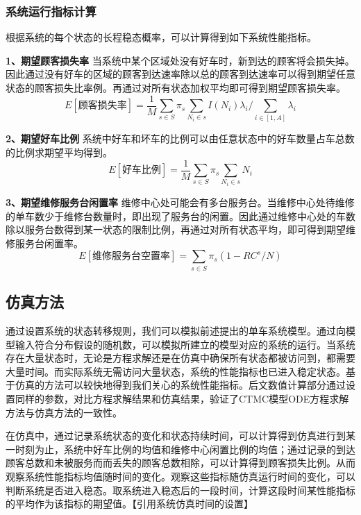 \documentclass{article}
\begin{document}
\subsubsection{系统运行指标计算}
根据系统的每个状态的长程稳态概率，可以计算得到如下系统性能指标。

\textbf{1、期望顾客损失率}
当系统中某个区域处没有好车时，新到达的顾客将会损失掉。因此通过没有好车的区域的顾客到达速率除以总的顾客到达速率可以得到期望任意状态的顾客损失比率例。再通过对所有状态加权平均即可得到期望顾客损失率。
\begin{equation}
E[\mbox{顾客损失率}] = \frac{1}{M} \sum \limits _{s \in S} \pi_{s} \sum \limits _{N_i \in s} I(N_i) \lambda_i / \sum \limits _{i \in [1,A]} \lambda_i 
\end{equation}

\textbf{2、期望好车比例}
系统中好车和坏车的比例可以由任意状态中的好车数量占车总数的比例求期望平均得到。
\begin{equation}
    E[\mbox{好车比例}] = \frac{1}{M} \sum \limits _{s \in S} \pi_{s} \sum \limits _{N_i \in s} N_i 
\end{equation}

\textbf{3、期望维修服务台闲置率}
维修中心处可能会有多台服务台。当维修中心处待维修的单车数少于维修台数量时，即出现了服务台的闲置。因此通过维修中心处的车数除以服务台数得到某一状态的限制比例，再通过对所有状态平均，即可得到期望维修服务台闲置率。
\begin{equation}
E[\mbox{维修服务台空置率}] = \sum \limits _{s \in S} \pi_{s} (1 - RC^s / N)
\end{equation}


\subsection{仿真方法}
通过设置系统的状态转移规则，我们可以模拟前述提出的单车系统模型。通过向模型输入符合分布假设的随机数，可以模拟所建立的模型对应的系统的运行。当系统存在大量状态时，无论是方程求解还是在仿真中确保所有状态都被访问到，都需要大量时间。而实际系统无需访问大量状态，系统的性能指标也已进入稳定状态。基于仿真的方法可以较快地得到我们关心的系统性能指标。后文数值计算部分通过设置同样的参数，对比方程求解结果和仿真结果，验证了CTMC模型ODE方程求解方法与仿真方法的一致性。

在仿真中，通过记录系统状态的变化和状态持续时间，可以计算得到仿真进行到某一时刻为止，系统中好车比例的均值和维修中心闲置比例的均值；通过记录的到达顾客总数和未被服务而而丢失的顾客总数相除，可以计算得到顾客损失比例。从而观察系统性能指标均值随时间的变化。观察这些指标随仿真运行时间的变化，可以判断系统是否进入稳态。取系统进入稳态后的一段时间，计算这段时间某性能指标的平均作为该指标的期望值。【引用系统仿真时间的设置】
\end{document}

